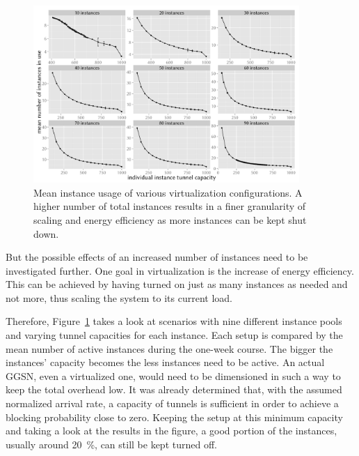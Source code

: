 \begin{figure}[htb]
	\centering
	\includegraphics[width=0.9\textwidth]{images/R-virtualized-mean-instanceusage.pdf}
	\caption{Mean instance usage of various virtualization configurations. A higher number of total instances results in a finer granularity of scaling and energy efficiency as more instances can be kept shut down.}
\label{c4:fig:res-instance-usage-mean}
\end{figure}

But the possible effects of an increased number of instances need to be investigated further. One goal in virtualization is the increase of energy efficiency. This can be achieved by having turned on just as many instances as needed and not more, thus scaling the system to its current load. 

Therefore, Figure~\ref{c4:fig:res-instance-usage-mean} takes a look at scenarios with nine different instance pools and varying tunnel capacities for each instance. Each setup is compared by the mean number of active instances during the one-week course. The bigger the instances' capacity becomes the less instances need to be active. An actual \gls{GGSN}, even a virtualized one, would need to be dimensioned in such a way to keep the total overhead low. It was already determined that, with the assumed normalized arrival rate, a capacity of  tunnels is sufficient in order to achieve a blocking probability close to zero. Keeping the setup at this minimum capacity and taking a look at the results in the figure, a good portion of the instances, usually around \SI{20}{\percent}, can still be kept turned off.


